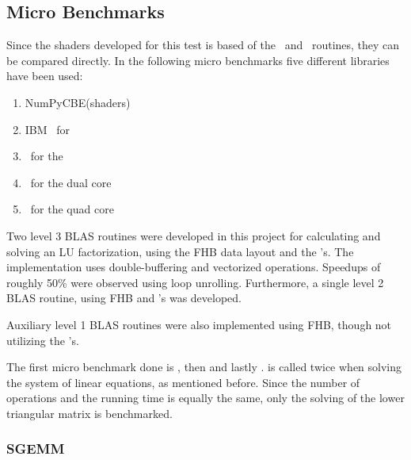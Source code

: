 

\newpage
\subsection{Micro Benchmarks}
\label{lbl:micro_benchmarks}

Since the shaders developed for this test is based of the \LAPACK\ and
\BLAS\ routines, they can be compared directly. In the following micro
benchmarks five different libraries have been used:

\begin{enumerate}
\item{NumPyCBE(shaders)}
\item{IBM \BLAS\ for \CBE{}}
\item{\ATLAS\ for the \PPE{}}
\item{\ATLAS\ for the dual core}
\item{\ATLAS\ for the quad core}
\end{enumerate}

Two level 3 BLAS routines were developed in this project for
calculating and solving an LU factorization, using the FHB data layout
and the \SPE{}'s. The implementation uses double-buffering and
vectorized operations. Speedups of roughly 50\% were observed using
loop unrolling. Furthermore, a single level 2 BLAS routine, using FHB
and \SPE{}'s was developed.

Auxiliary level 1 BLAS routines were also implemented using FHB,
though not utilizing the \SPE{}'s.

The first micro benchmark done is ,
then  and lastly .  is
called twice when solving the system of linear equations, as mentioned
before. Since the number of operations and the running time is equally
the same, only the solving of the lower triangular matrix is
benchmarked.






\subsubsection{SGEMM}


